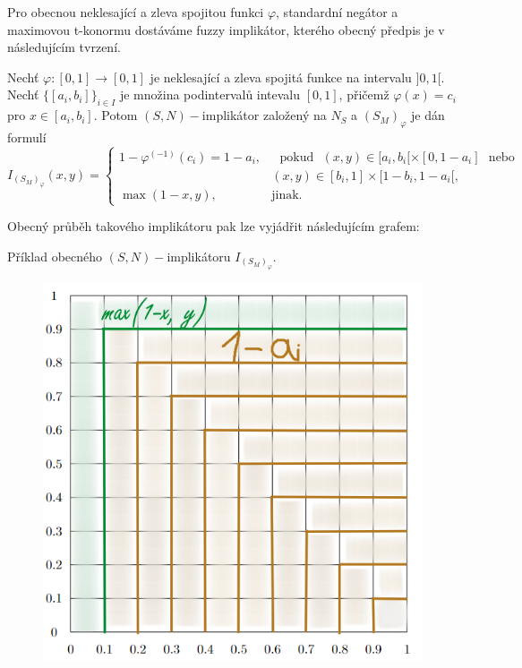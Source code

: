 Pro obecnou neklesající a zleva spojitou funkci $\varphi$, standardní negátor a maximovou t-konormu dostáváme fuzzy implikátor, kterého obecný předpis je v následujícím tvrzení.
\begin{sentence}
\cite{mitav}
\label{sn-impl}
       Nechť $\varphi:[0,1]\rightarrow [0,1]$
je neklesající a zleva spojitá funkce na intervalu $]0,1[$.
Nechť
$\{[a_i,b_i]\}_{i\in I}$ je množina podintervalů intevalu $[0,1]$, přičemž $\varphi(x)=c_i$ pro $x\in
[a_i,b_i]$.
Potom $(S,N)-$implikátor založený na $N_S$ a $(S_M)_{\varphi}$ je dán formulí
$$ I_{(S_M)_{\varphi}}(x,y) = \begin{cases} 1-\varphi^{(-1)}(c_i)=1-a_i, &\mbox {~~pokud~~}
(x,y)\in [a_i,b_i[\times[0,1-a_i] \mbox{~~nebo~~}
\\ & (x,y)\in [b_i,1]\times[1-b_i,1-a_i[,
\\ \max(1-x,y), &\mbox {jinak.}
\end{cases} $$

\end{sentence}

Obecný průběh takového implikátoru pak lze vyjádřit následujícím grafem:
\begin{graph}
    Příklad obecného $(S,N)-$implikátoru $I_{(S_M)_{\varphi}}$.
            \begin{figure}[H]
                \hspace{-1cm}
                \includegraphics[scale=0.5]{template-fig/sn-implphi.PNG}
                \centering
            \end{figure}
\end{graph}

